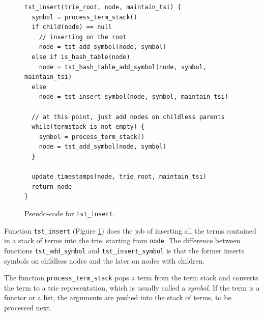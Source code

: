 \begin{figure}[ht]
\begin{Verbatim}[fontsize=\small]
tst_insert(trie_root, node, maintain_tsi) {
  symbol = process_term_stack()
  if child(node) == null
    // inserting on the root
    node = tst_add_symbol(node, symbol)
  else if is_hash_table(node)
    node = tst_hash_table_add_symbol(node, symbol, maintain_tsi)
  else
    node = tst_insert_symbol(node, symbol, maintain_tsi)
  
  // at this point, just add nodes on childless parents
  while(termstack is not empty) {
    symbol = process_term_stack()
    node = tst_add_symbol(node, symbol)
  }
  
  update_timestamps(node, trie_root, maintain_tsi)
  return node
}
\end{Verbatim}
\caption{Pseudo-code for \texttt{tst\_insert}.}
\label{fig:tst_insert}
\end{figure}

Function \texttt{tst\_insert} (Figure \ref{fig:tst_insert}) does the job of inserting
all the terms contained in a stack of terms into the trie, starting from \texttt{node}.
The difference between functions \texttt{tst\_add\_symbol} and \texttt{tst\_insert\_symbol}
is that the former inserts symbols on childless nodes and the later on nodes with children.

The function \texttt{process\_term\_stack} pops a term from the term stack and converts the term
to a trie representation, which is usually called a \textit{symbol}. If the term is a functor or a list,
the arguments are pushed into the stack of terms, to be processed next.

